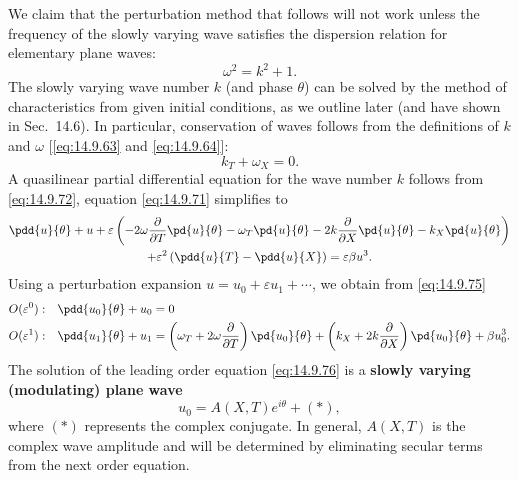 We claim that the perturbation method that follows will not work unless the frequency of the slowly varying wave satisfies the dispersion relation for elementary plane waves:
\begin{equation}
\boxed{\omega^2 = k^2 + 1.}
\label{eq:14.9.72}
\end{equation}
The slowly varying wave number $k$ (and phase $\theta$) can be solved by the method of characteristics from given initial conditions, as we outline later (and have shown in Sec.\ 14.6). In particular, conservation of waves follows from the definitions of $k$ and $\omega$ [\eqref{eq:14.9.63} and \eqref{eq:14.9.64}]:
\begin{equation}
k_T + \omega_X = 0.
\label{eq:14.9.74}
\end{equation}
A quasilinear partial differential equation for the wave number $k$ follows from \eqref{eq:14.9.72}, equation \eqref{eq:14.9.71} simplifies to
\begin{multline}
\pdd{u}{\theta} + u + \varepsilon\left(-2\omega\frac{\partial}{\partial T}\pd{u}{\theta} - \omega_T\pd{u}{\theta} - 2k\frac{\partial}{\partial X}\pd{u}{\theta} - k_X\pd{u}{\theta}\right) \\
+ \varepsilon^2\left(\pdd{u}{T} - \pdd{u}{X}\right) = \varepsilon\beta u^3. \label{eq:14.9.75}
\end{multline}
Using a perturbation expansion $u = u_0 + \varepsilon u_1 + \cdots$, we obtain from \eqref{eq:14.9.75}
\begin{align}
O(\varepsilon^0): \quad &\pdd{u_0}{\theta} + u_0 = 0 \label{eq:14.9.76} \\
O(\varepsilon^1): \quad &\pdd{u_1}{\theta} + u_1 = \left(\omega_T + 2\omega\frac{\partial}{\partial T}\right)\pd{u_0}{\theta} + \left(k_X + 2k\frac{\partial}{\partial X}\right)\pd{u_0}{\theta} + \beta u_0^3. \label{eq:14.9.77}
\end{align}
The solution of the leading order equation \eqref{eq:14.9.76} is a \textbf{slowly varying (modulating) plane wave}
\begin{equation}
\boxed{u_0 = A(X,T)e^{i\theta} + (*),}
\label{eq:14.9.78}
\end{equation}
where $(*)$ represents the complex conjugate. In general, $A(X,T)$ is the complex wave amplitude and will be determined by eliminating secular terms from the next order equation.

